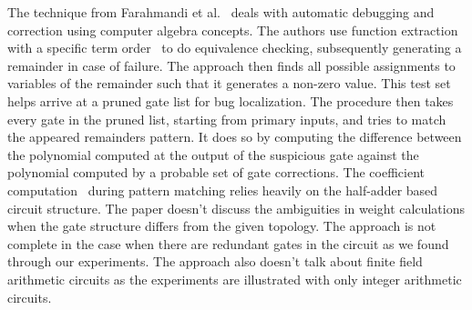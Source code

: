 The technique from Farahmandi et al.~\cite{farimah:2016} deals with automatic debugging and correction using computer algebra concepts. The authors use function extraction~\cite{maciej:2015:1} with a specific term order~\cite{lv} to do equivalence checking, subsequently generating a remainder in case of failure. The approach then finds all possible assignments to variables of the remainder such that it generates a non-zero value. This test set helps arrive at a pruned gate list for bug localization. The procedure then takes every gate in the pruned list, starting from primary inputs, and tries to match the appeared remainders pattern. It does so by computing the difference between the polynomial computed at the output of the suspicious gate against the polynomial computed by a probable set of gate corrections. The coefficient computation~\cite{maciej:2015:2} during pattern matching relies heavily on the half-adder based circuit structure. The paper doesn't discuss the ambiguities in weight calculations when the gate structure differs from the given topology. The approach is not complete in the case when there are redundant gates in the circuit as we found through our experiments. The approach also doesn't talk about finite field arithmetic circuits as the experiments are illustrated with only integer arithmetic circuits.




